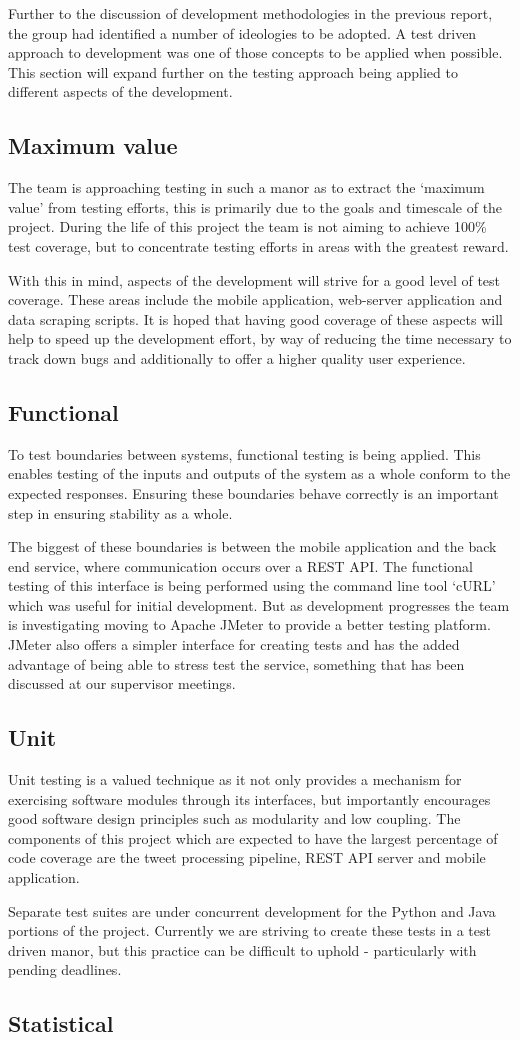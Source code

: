 Further to the discussion of development methodologies in the previous report,
the group had identified a number of ideologies to be adopted. A test driven
approach to development was one of those concepts to be applied when possible.
This section will expand further on the testing approach being applied to
different aspects of the development. 

\subsection{Maximum value}
The team is approaching testing in such a manor as to extract the `maximum
value’ from testing efforts, this is primarily due to the goals and timescale
of the project. During the life of this project the team is not aiming to
achieve 100\% test coverage, but to concentrate testing efforts in areas with
the greatest reward.

With this in mind, aspects of the development will strive for a good level of
test coverage. These areas include the mobile application, web-server
application and data scraping scripts. It is hoped that having good coverage of
these aspects will help to speed up the development effort, by way of reducing
the time necessary to track down bugs and additionally to offer a higher
quality user experience.

\subsection{Functional}
To test boundaries between systems, functional testing is being applied. This
enables testing of  the inputs and outputs of the system as a whole conform to
the expected responses. Ensuring these boundaries behave correctly is an
important step in ensuring stability as a whole.

The biggest of these boundaries is between the mobile application and the back
end service, where communication occurs over a REST API. The functional testing
of this interface is being performed using the command line tool ‘cURL’ which
was useful for initial development. But as development progresses the team is
investigating moving to Apache JMeter to provide a better testing platform.
JMeter also offers a simpler interface for creating tests and has the added
advantage of being able to stress test the service, something that has been
discussed at our supervisor meetings.

\subsection{Unit}
Unit testing is a valued technique as it not only provides a mechanism for
exercising software modules through its interfaces, but importantly encourages
good software design principles such as modularity and low coupling. The
components of this project which are expected to have the largest percentage of
code coverage are the tweet processing pipeline, REST API server and mobile
application.

Separate test suites are under concurrent development for the Python and Java
portions of the project. Currently we are striving to create these tests in a
test driven manor, but this practice can be difficult to uphold - particularly
with pending deadlines.

\subsection{Statistical}

